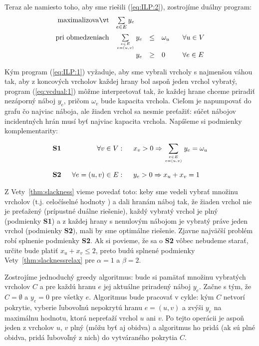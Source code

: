 \setcounter{equation}{\tmp}

\noindent
Teraz ale namiesto toho, aby sme riešili (\ref{eq:ILP:2}), zostrojíme duálny program: 
\begin{equation}
  \label{eq:vcdual:1}
\begin{array}{rrcll}
  {\rm maximalizovať}     & \multicolumn{1}{l}{\sum\limits_{e\in E}y_e}\\[3ex]
  {\rm pri\ obmedzeniach} & \sum\limits_{e\in E\atop e=(u,v)}y_e&\le&\omega_u& \;\;\;\forall u\in V\\[3ex]
                          & y_e&\ge&0& \;\;\;\forall e\in E\\
\end{array}
\end{equation}

\noindent
Kým program (\ref{eq:ILP:1}) vyžaduje, aby sme vybrali vrcholy s najmenšou váhou tak, aby z koncových vrcholov
každej hrany bol aspoň jeden vrchol vybratý, program (\ref{eq:vcdual:1}) môžme interpretovať tak, že
každej hrane chceme priradiť nezáporný náboj $y_e$, pričom $\omega_v$ bude kapacita vrchola. 
Cieľom je napumpovať do grafu čo najviac náboja, ale
žiaden vrchol sa nesmie preťažiť: súčet nábojov incidentných hrán musí byť najviac kapacita vrchola.
Napíšeme si podmienky komplementarity:

$$\begin{array}{lrl}
  {\bf S1} \;\;&\forall v\in V:\;\;&x_v>0\Rightarrow
  \displaystyle\sum\limits_{e\in E\atop e=(u,v)}y_e=\omega_u\\[6ex]
  {\bf S2} \;\;&\forall e=(u,v)\in E:\;\; & y_e>0\Rightarrow x_u+x_v=1
\end{array}$$

\noindent
Z Vety~\ref{thm:slackness} vieme povedať toto: keby sme vedeli vybrať množinu vrcholov 
(t.j. celočíselné hodnoty )
a dali hranám náboj tak, že žiaden vrchol nie je preťažený (prípustné duálne riešenie), každý vybratý
vrchol je plný (podmienky {\bf S1}) a 
z každej hrany s nenulovým nábojom je vybratý práve jeden vrchol (podmienky 
{\bf S2}), mali by sme optimálne riešenie.
Zjavne najväčší problém robí splnenie podmienky {\bf S2}. Ak si povieme, že sa o {\bf S2} vôbec nebudeme starať,
určite bude platiť $x_u+x_v\le2$, preto budú splnené podmienky Vety~\ref{thm:slacknessrelax} pre $\alpha=1$ a 
$\beta=2$.

\noindent
Zostrojíme jednoduchý greedy algoritmus: bude si pamätať množinu vybratých vrcholov $C$ a pre každú hranu 
$e$ jej aktuálne priradený náboj $y_e$. Začne s tým, že $C=\emptyset$ a $y_e=0$ pre všetky $e$. Algoritmus bude 
pracovať v cykle: kým $C$ netvorí pokrytie, vyberie ľubovoľnú nepokrytú hranu $e=(u,v)$ a zvýši $y_e$ na maximálnu
hodnotu, ktorá nepreťaží vrchol $u$ ani $v$. Po tejto operácii je aspoň jeden z vrcholov $u$, $v$ plný (môžu
byť aj obidva) a algoritmus ho pridá (ak sú plné obidva, pridá ľubovoľný z nich) do vytváraného pokrytia $C$.

